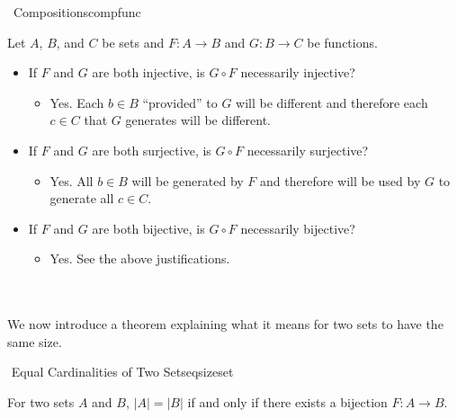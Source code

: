         \begin{exercise}{\Difficulty\,\Difficulty\,\,Compositions}{compfunc}
        
            Let \(A\), \(B\), and \(C\) be sets and \(F:A\to B\) and \(G:B\to C\) be functions.
            
            \begin{itemize}
                \item If \(F\) and \(G\) are both injective, is \(G\circ F\) necessarily injective?
                \begin{itemize}
                    \item Yes. Each \(b\in B\) ``provided'' to \(G\) will be different and therefore each \(c\in C\) that \(G\) generates will be different.
                \end{itemize}
                \item If \(F\) and \(G\) are both surjective, is \(G\circ F\) necessarily surjective?
                \begin{itemize}
                    \item Yes. All \(b\in B\) will be generated by \(F\) and therefore will be used by \(G\) to generate all \(c\in C\).
                \end{itemize}
                \item If \(F\) and \(G\) are both bijective, is \(G\circ F\) necessarily bijective?
                \begin{itemize}
                    \item Yes. See the above justifications.
                \end{itemize}
            \end{itemize}
        
        \end{exercise}
        \vphantom
        \\
        \\
        We now introduce a theorem explaining what it means for two sets to have the same size.
        \begin{theorem}{\Stop\,\,Equal Cardinalities of Two Sets}{eqsizeset}
        
            For two sets \(A\) and \(B\), \(|A|=|B|\) if and only if there exists a bijection \(F:A\to B\).
        
        \end{theorem}
        \vphantom
        \\
        \\
